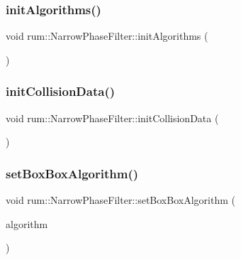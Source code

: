 \subsubsection{\texorpdfstring{init\+Algorithms()}{initAlgorithms()}}
{\footnotesize\ttfamily void rum\+::\+Narrow\+Phase\+Filter\+::init\+Algorithms (\begin{DoxyParamCaption}{ }\end{DoxyParamCaption})\hspace{0.3cm}{\ttfamily [protected]}}

\mbox{\label{classrum_1_1_narrow_phase_filter_afde3247e3cea00a46f8bf360951930d0}} 
\subsubsection{\texorpdfstring{init\+Collision\+Data()}{initCollisionData()}}
{\footnotesize\ttfamily void rum\+::\+Narrow\+Phase\+Filter\+::init\+Collision\+Data (\begin{DoxyParamCaption}{ }\end{DoxyParamCaption})\hspace{0.3cm}{\ttfamily [protected]}}

\mbox{\label{classrum_1_1_narrow_phase_filter_a888f91e93de3ee05bcf0811a7d39ea2c}} 
\subsubsection{\texorpdfstring{set\+Box\+Box\+Algorithm()}{setBoxBoxAlgorithm()}}
{\footnotesize\ttfamily void rum\+::\+Narrow\+Phase\+Filter\+::set\+Box\+Box\+Algorithm (\begin{DoxyParamCaption}\item[{\mbox{\hyperlink{classrum_1_1_narrow_phase_filter_a499acd63e16f164dbf1ee7567c1a3e0f}{Algorithm}}$<$ \mbox{\hyperlink{classrum_1_1_i_box_box_narrow_algorithm}{I\+Box\+Box\+Narrow\+Algorithm}} $>$}]{algorithm }\end{DoxyParamCaption})}

